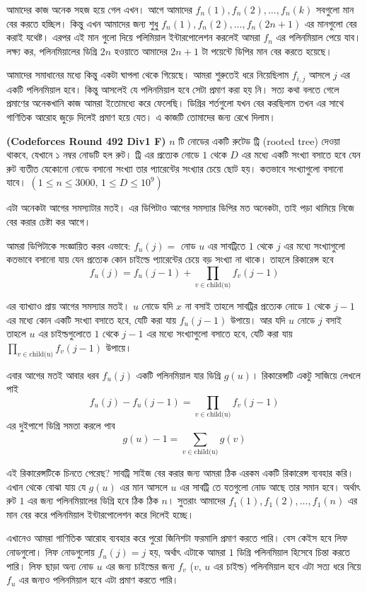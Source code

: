 \begin{solution}
আমাদের কাজ অনেক সহজ হয়ে গেল এখন। আগে আমাদের $f_{n}(1), f_{n}(2), \dots, f_{n}(k)$ সবগুলো মান বের করতে হচ্ছিল। কিন্তু এখন আমাদের জন্য শুধু $f_{n}(1), f_{n}(2), \dots, f_{n}(2n + 1)$ এর মানগুলো বের করাই যথেষ্ট। এরপর এই মান গুলো দিয়ে পলিমিয়াল ইন্টারপোলেশন করলেই আমরা $f_{n}$ এর পলিনমিয়াল পেয়ে যাব। লক্ষ্য কর, পলিনমিয়ালের ডিগ্রি $2n$ হওয়াতে আমাদের $2n + 1$ টা পয়েন্টে ডিপির মান বের করতে হয়েছে। 

আমাদের সমাধানের মধ্যে কিন্তু একটা ঘাপলা থেকে গিয়েছে। আমরা শুরুতেই ধরে নিয়েছিলাম $f_{i, j}$ আসলে $j$ এর একটি পলিনমিয়াল হবে। কিন্তু আসলেই যে পলিনমিয়াল হবে সেটা প্রমাণ করা হয় নি। সত্য কথা বলতে গেলে প্রমাণের অনেকখানি কাজ আমরা ইতোমধ্যে করে ফেলেছি। ডিগ্রির শর্তগুলো যখন বের করছিলাম তখন এর সাথে গাণিতিক আরোহ জুড়ে দিলেই প্রমাণ হয়ে যেত। এ কাজটি তোমাদের জন্য রেখে দিলাম।   
\end{solution}

\begin{problem} \textbf{(Codeforces Round 492 Div1 F)} $n$ টি নোডের একটি রুটেড ট্রি (rooted tree) দেওয়া থাকবে, যেখানে ১ নম্বর নোডটি হল রুট। ট্রি এর প্রত্যেক নোডে $1$ থেকে $D$ এর মধ্যে একটি সংখ্যা বসাতে হবে যেন রুট ব্যতীত যেকোনো নোডে বসানো সংখ্যা তার প্যারেন্টের সংখ্যার চেয়ে ছোট হয়। কতভাবে সংখ্যাগুলো বসানো যাবে। $(1 \leq n \leq 3000, \, 1 \leq D \leq 10^9)$
\end{problem} 
\begin{solution}
এটা অনেকটা আগের সমস্যাটার মতই। এর ডিপিটাও আগের সমস্যার ডিপির মত অনেকটা, তাই পড়া থামিয়ে নিজে বের করার চেষ্টা কর আগে। 

আমরা ডিপিটাকে সংজ্ঞায়িত করব এভাবে: $f_{u}(j) = $ নোড $u$ এর সাবট্রিতে $1$ থেকে $j$ এর মধ্যে সংখ্যাগুলো কতভাবে বসানো যায় যেন প্রত্যেক কোন চাইল্ডে প্যারেন্টের চেয়ে বড় সংখ্যা না থাকে। তাহলে রিকারেন্স হবে 
$$f_{u}(j) = f_{u}(j - 1) + \prod_{v \in \text{child(u)}} f_{v}(j - 1)$$ 

এর ব্যাখ্যাও প্রায় আগের সমস্যার মতই। $u$ নোডে যদি $x$ না বসাই তাহলে সাবট্রির প্রত্যেক নোডে $1$ থেকে $j - 1$ এর মধ্যে কোন একটি সংখ্যা বসাতে হবে, যেটি করা যায় $f_{u}(j - 1)$ উপায়ে। আর যদি $u$ নোডে $j$ বসাই তাহলে $u$ এর চাইল্ডগুলোতে  $1$ থেকে $j - 1$ এর মধ্যে সংখ্যাগুলো বসাতে হবে, যেটি করা যায় $\prod_{v \in \text{child(u)}} f_{v}(j - 1)$ উপায়ে। 

এবার আগের মতই আবার ধরব $f_{u}(j)$ একটি পলিনমিয়াল যার ডিগ্রি $g(u)$। রিকারেন্সটি একটু সাজিয়ে লেখলে পাই 
$$f_{u}(j) - f_{u}(j - 1) = \prod_{v \in \text{child(u)}} f_{v}(j - 1)$$ 
এর দুইপাশে ডিগ্রি সমতা করলে পাব 
$$g(u) - 1 = \sum_{v \in \text{child(u)}} g(v)$$

এই রিকারেন্সটিকে চিনতে পেরেছ? সাবট্রি সাইজ বের করার জন্য আমরা ঠিক এরকম একটি রিকারেন্স ব্যবহার করি। এখান থেকে বোঝা যায় যে $g(u)$ এর মান আসলে $u$ এর সাবট্রি তে যতগুলো নোড আছে তার সমান হবে। অর্থাৎ রুট $1$ এর জন্য পলিনমিয়ালের ডিগ্রি হবে ঠিক ঠিক $n$।  সুতরাং আমাদের $f_{1}(1), f_{1}(2), \dots, f_{1}(n)$ এর মান বের করে পলিনমিয়াল ইন্টারপোলেশন করে দিলেই হচ্ছে। 

এখানেও আমরা গাণিতিক আরোহ ব্যবহার করে পুরো জিনিশটা ফরমালি প্রমাণ করতে পারি। বেস কেইস হবে লিফ নোডগুলো। লিফ নোডগুলোয় $f_{u}(j) = j$ হয়, অর্থাৎ এটাকে আমরা $1$ ডিগ্রি পলিনমিয়াল হিসেবে চিন্তা করতে পারি। লিফ ছাড়া অন্য নোড $u$ এর জন্য চাইল্ডের জন্য $f_{v}$ ($v, \, u$ এর চাইল্ড) পলিনমিয়াল হবে এটা সত্য ধরে নিয়ে $f_{u}$ এর জন্যও পলিনমিয়াল হবে এটা প্রমাণ করতে পারি। 
\end{solution}
